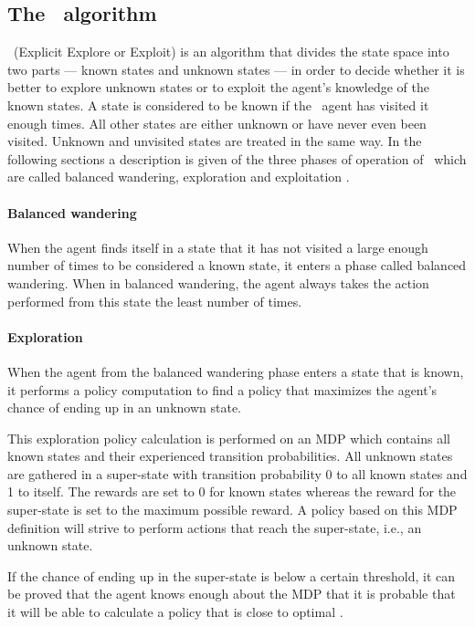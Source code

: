 \subsection{The \etre\ algorithm}
\label{sec:e3}

\etre\ (Explicit Explore or Exploit) is an algorithm that divides the state space into two parts --- known states and unknown states --- in order to decide whether it is better to explore unknown states or to exploit the agent's knowledge of the known states. A state is considered to be known if the \etre\ agent has visited it enough times. All other states are either unknown or have never even been visited. Unknown and unvisited states are treated in the same way. In the following sections a description is given of the three phases of operation of \etre\, which are called balanced wandering, exploration and exploitation \parencite{kearns2002near}.

\paragraph{Balanced wandering}

When the agent finds itself in a state that it has not visited a large enough number of times to be considered a known state, it enters a phase called balanced wandering. When in balanced wandering, the agent always takes the action performed from this state the least number of times. 


\paragraph{Exploration}
When the agent from the balanced wandering phase enters a state that is known, it performs a policy computation to find a policy that maximizes the agent's chance of ending up in an unknown state. 

This exploration policy calculation is performed on an MDP which contains all known states and their experienced transition probabilities. 
All unknown states are gathered in a super-state with transition probability 0 to all known states and 1 to itself. The rewards are set to 0 for known states whereas the reward for the super-state is set to the maximum possible reward. A policy based on this MDP definition will strive to perform actions that reach the super-state, i.e., an unknown state.

If the chance of ending up in the super-state is below a certain threshold, it can be proved that the agent knows enough about the MDP that it is probable that it will be able to calculate a policy that is close to optimal \parencite{kearns2002near}.

